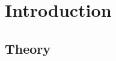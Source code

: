 \documentclass[a4papert,12pt]{report}%
\begin{document}
\section{Introduction}
\subsection{Theory}
\end{document}
